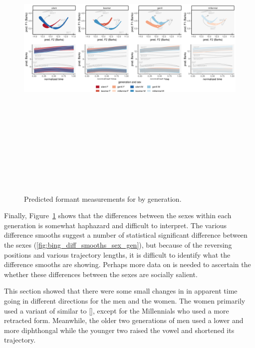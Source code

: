 \begin{figure}[p]
	\centering
	\includegraphics[angle = 90, origin = c, height = 6in]{Figures/BING/BING_sex_panel_plot_wide.pdf}
	\caption[Predicted formant measurements for \bing by generation.]{Predicted formant measurements for \bing by generation.}
	\label{fig:BING_sex_panel_plot_wide}
\end{figure}

Finally, Figure~\ref{fig:BING_sex_panel_plot_wide} shows that the differences between the sexes within each generation is somewhat haphazard and difficult to interpret. The various difference smooths suggest a number of statistical significant difference between the sexes (\ref{fig:bing_diff_smooths_sex_gen}), but because of the reversing positions and various trajectory lengths, it is difficult to identify what the difference smooths are showing. Perhaps more data on \bing is needed to ascertain the whether these differences between the sexes are socially salient.

This section showed that there were some small changes in \bing in apparent time going in different directions for the men and the women. The women primarily used a variant of \bing similar to [], except for the Millennials who used a more retracted form. Meanwhile, the older two generations of men used a lower and more diphthongal \bing while the younger two raised the vowel and shortened its trajectory.







